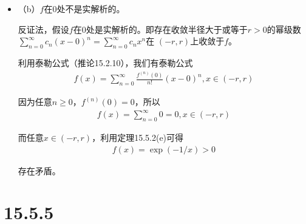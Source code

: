 \documentclass{article}
\begin{document}
\begin{itemize}
\begin{itemize}
          \item （b）$f$在$0$处不是实解析的。


                反证法，假设$f$在$0$处是实解析的。即存在收敛半径大于或等于$r> 0$的幂级数
                $\sum\limits_{n = 0}^\infty c_n(x - 0)^n = \sum\limits_{n = 0}^\infty c_nx^n$在
                $(-r, r)$上收敛于$f$。

                利用泰勒公式（推论15.2.10），我们有泰勒公式
                \begin{align*}
                  f(x) = \sum\limits_{n = 0}^\infty \frac{f^{(n)}(0)}{n!}(x - 0)^n, x \in (-r, r)
                \end{align*}

                因为任意$n \geq 0$，$f^{(n)}(0) = 0$，所以
                \begin{align*}
                  f(x) = \sum\limits_{n = 0}^\infty 0 = 0, x \in (-r, r)
                \end{align*}

                而任意$x \in (-r, r)$，利用定理15.5.2(e)可得
                \begin{align*}
                  f(x) = \exp(-1/x) > 0
                \end{align*}

                存在矛盾。


        \end{itemize}
\end{itemize}

\section*{15.5.5}
\end{document}
